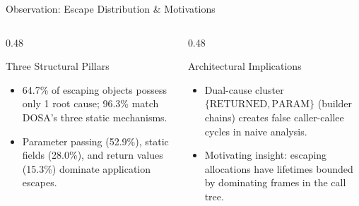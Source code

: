 \documentclass[11pt]{beamer}
\begin{document}
\begin{frame}{Observation: Escape Distribution \& Motivations}
  \begin{columns}[T,onlytextwidth]
    \begin{column}{0.48\textwidth}
      \begin{block}{Three Structural Pillars}
        \scriptsize
        \begin{itemize}\setlength{\itemsep}{1pt}
          \item 64.7\% of escaping objects possess only 1 root cause; 96.3\% match DOSA's three static mechanisms.
          \item Parameter passing (52.9\%), static fields (28.0\%), and return values (15.3\%) dominate application escapes.
        \end{itemize}
      \end{block}
    \end{column}

    \begin{column}{0.48\textwidth}
      \begin{block}{Architectural Implications}
        \scriptsize
        \begin{itemize}\setlength{\itemsep}{1pt}
          \item Dual-cause cluster $\{\text{RETURNED}, \text{PARAM}\}$ (builder chains) creates false caller-callee cycles in naive analysis.
          \item Motivating insight: escaping allocations have lifetimes bounded by dominating frames in the call tree.
        \end{itemize}
      \end{block}
    \end{column}
  \end{columns}
\end{frame}
\endgroup
\end{document}
